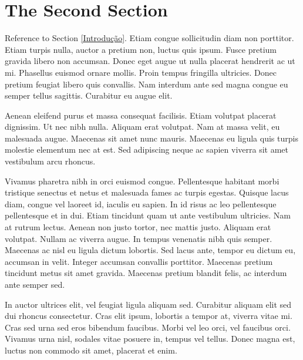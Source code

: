 \documentclass[preprint,12pt,times]{elsarticle}
\begin{document}
	\section{The Second Section}
	\label{S:3}
	
	Reference to Section \ref{Introdução}. Etiam congue sollicitudin diam non porttitor. Etiam turpis nulla, auctor a pretium non, luctus quis ipsum. Fusce pretium gravida libero non accumsan. Donec eget augue ut nulla placerat hendrerit ac ut mi. Phasellus euismod ornare mollis. Proin tempus fringilla ultricies. Donec pretium feugiat libero quis convallis. Nam interdum ante sed magna congue eu semper tellus sagittis. Curabitur eu augue elit.
	
	Aenean eleifend purus et massa consequat facilisis. Etiam volutpat placerat dignissim. Ut nec nibh nulla. Aliquam erat volutpat. Nam at massa velit, eu malesuada augue. Maecenas sit amet nunc mauris. Maecenas eu ligula quis turpis molestie elementum nec at est. Sed adipiscing neque ac sapien viverra sit amet vestibulum arcu rhoncus.
	
	Vivamus pharetra nibh in orci euismod congue. Pellentesque habitant morbi tristique senectus et netus et malesuada fames ac turpis egestas. Quisque lacus diam, congue vel laoreet id, iaculis eu sapien. In id risus ac leo pellentesque pellentesque et in dui. Etiam tincidunt quam ut ante vestibulum ultricies. Nam at rutrum lectus. Aenean non justo tortor, nec mattis justo. Aliquam erat volutpat. Nullam ac viverra augue. In tempus venenatis nibh quis semper. Maecenas ac nisl eu ligula dictum lobortis. Sed lacus ante, tempor eu dictum eu, accumsan in velit. Integer accumsan convallis porttitor. Maecenas pretium tincidunt metus sit amet gravida. Maecenas pretium blandit felis, ac interdum ante semper sed.
	
	In auctor ultrices elit, vel feugiat ligula aliquam sed. Curabitur aliquam elit sed dui rhoncus consectetur. Cras elit ipsum, lobortis a tempor at, viverra vitae mi. Cras sed urna sed eros bibendum faucibus. Morbi vel leo orci, vel faucibus orci. Vivamus urna nisl, sodales vitae posuere in, tempus vel tellus. Donec magna est, luctus non commodo sit amet, placerat et enim.
			
	
	
		
\end{document}
